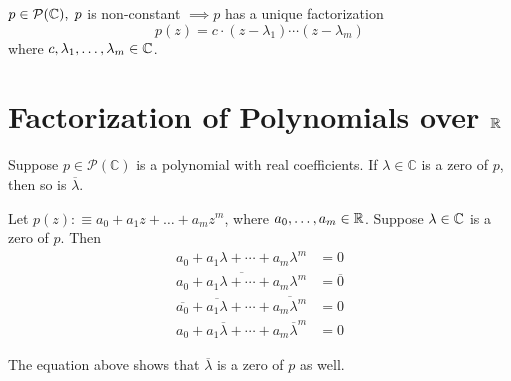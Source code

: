 \begin{thm} 
  \label{fundamental-theorem-of-algebra-second-version}
  $p \in \mathcal{P}(\mathbb{C}), \; p$ is non-constant $\implies p$ has a unique factorization
  \begin{equation}
  	p(z)=c \cdot (z-\lambda_1) \cdots (z-\lambda_m)
  \end{equation}
  where $c, \lambda_1, \dots, \lambda_m \in \mathbb{C}$.
\end{thm}

\section{Factorization of Polynomials over \texorpdfstring{$\mathbb{R}$}{R}}

\begin{thm}
  \label{thm: polynomials with real coefficients have nonreal zeros in pairs}
  Suppose $p\in \mathcal{P} (\mathbb{C})$ is a polynomial with real coefficients. If $\lambda \in \mathbb{C}$ is a zero of $p$, then so is $\overline{\lambda}$.
\end{thm}
\begin{prf}
  Let $p(z) :\equiv a_0 + a_1 z + \ldots + a_m z^m$, where $a_0, \ldots, a_m \in \mathbb{R}$. Suppose $\lambda \in \mathbb{C}$ is a zero of $p$. Then
  \begin{equation}
    \begin{aligned}
      a_0+a_1\lambda+\cdots+a_m\lambda^m&=0\\
      \overline{a_0+a_1\lambda+\cdots+a_m\lambda^m}&=\overline{0}\\
      \overline{a_0}+\overline{a_1\lambda}+\cdots+\overline{a_m\lambda^m}&=0\\
      a_0+a_1\overline{\lambda}+\cdots+a_m\overline{\lambda}^m&=0
    \end{aligned}
  \end{equation}

  The equation above shows that $\overline{\lambda}$ is a zero of $p$ as well.
\end{prf}

